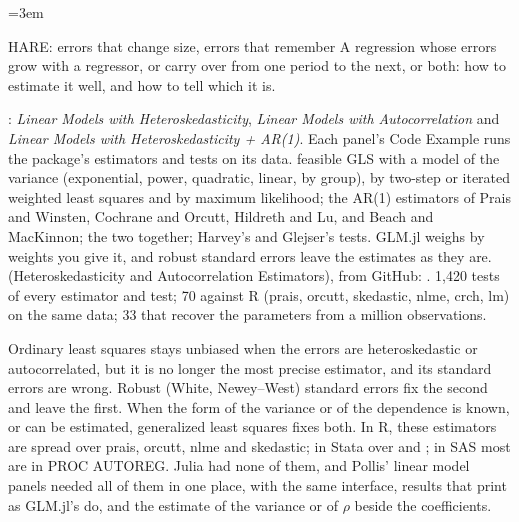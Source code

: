 \emergencystretch=3em

  {HARE: errors that change size, errors that remember}
  {A regression whose errors grow with a regressor, or carry over from one period to the next, or both: how to
   estimate it well, and how to tell which it is.}

\factsheet
  {: \emph{Linear Models with Heteroskedasticity}, \emph{Linear Models with
   Autocorrelation} and \emph{Linear Models with Heteroskedasticity + AR(1)}. Each panel's Code Example runs the
   package's estimators and tests on its data.}
  {feasible GLS with a model of the variance (exponential, power, quadratic, linear, by group), by two-step or
   iterated weighted least squares and by maximum likelihood; the AR(1) estimators of Prais and Winsten, Cochrane and
   Orcutt, Hildreth and Lu, and Beach and MacKinnon; the two together; Harvey's and Glejser's tests. GLM.jl weighs
   by weights you give it, and robust standard errors leave the estimates as they are.}
  { (Heteroskedasticity and Autocorrelation Estimators), from GitHub:
   .}
  {1,420 tests of every estimator and test; 70 against R (prais, orcutt, skedastic, nlme, crch, lm) on the same data;
   33 that recover the parameters from a million observations.}

Ordinary least squares stays unbiased when the errors are heteroskedastic or autocorrelated, but it is no longer the
most precise estimator, and its standard errors are wrong. Robust (White, Newey--West) standard errors fix the second
and leave the first. When the form of the variance or of the dependence is known, or can be estimated, generalized
least squares fixes both. In R, these estimators are spread over prais, orcutt, nlme and skedastic; in Stata over
 and ; in SAS most are in PROC AUTOREG. Julia had none of them, and Pollis' linear
model panels needed all of them in one place, with the same interface, results that print as GLM.jl's do, and the
estimate of the variance or of $\rho$ beside the coefficients.


